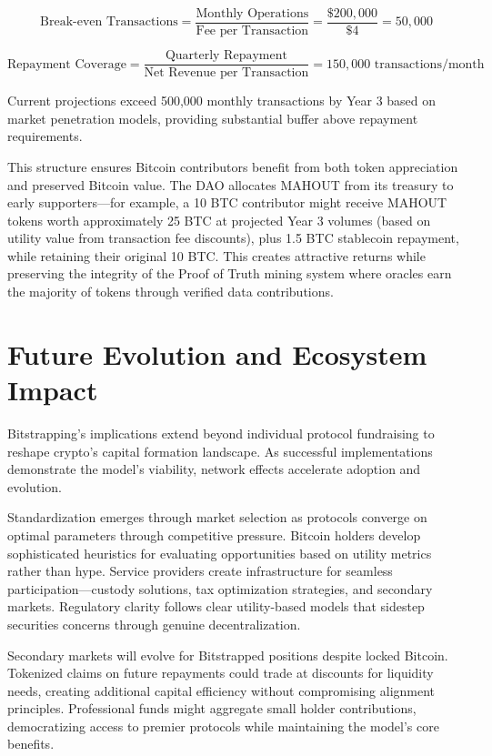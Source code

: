 \[
\text{Break-even Transactions} = \frac{\text{Monthly Operations}}{\text{Fee per Transaction}} = \frac{\$200{,}000}{\$4} = 50{,}000
\]

\[
\text{Repayment Coverage} = \frac{\text{Quarterly Repayment}}{\text{Net Revenue per Transaction}} = 150{,}000 \text{ transactions/month}
\]

Current projections exceed 500,000 monthly transactions by Year 3 based on market penetration models, providing substantial buffer above repayment requirements.

This structure ensures Bitcoin contributors benefit from both token appreciation and preserved Bitcoin value. The DAO allocates MAHOUT from its treasury to early supporters—for example, a 10 BTC contributor might receive MAHOUT tokens worth approximately 25 BTC at projected Year 3 volumes (based on utility value from transaction fee discounts), plus 1.5 BTC stablecoin repayment, while retaining their original 10 BTC. This creates attractive returns while preserving the integrity of the Proof of Truth mining system where oracles earn the majority of tokens through verified data contributions.

\section{Future Evolution and Ecosystem Impact}

Bitstrapping's implications extend beyond individual protocol fundraising to reshape crypto's capital formation landscape. As successful implementations demonstrate the model's viability, network effects accelerate adoption and evolution.

Standardization emerges through market selection as protocols converge on optimal parameters through competitive pressure. Bitcoin holders develop sophisticated heuristics for evaluating opportunities based on utility metrics rather than hype. Service providers create infrastructure for seamless participation—custody solutions, tax optimization strategies, and secondary markets. Regulatory clarity follows clear utility-based models that sidestep securities concerns through genuine decentralization.

Secondary markets will evolve for Bitstrapped positions despite locked Bitcoin. Tokenized claims on future repayments could trade at discounts for liquidity needs, creating additional capital efficiency without compromising alignment principles. Professional funds might aggregate small holder contributions, democratizing access to premier protocols while maintaining the model's core benefits.

